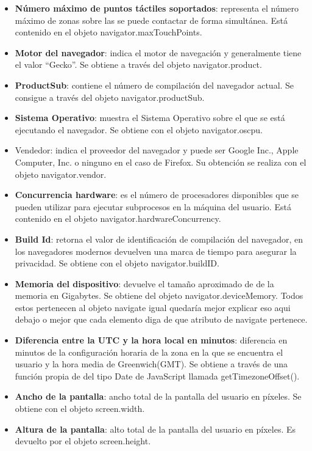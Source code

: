 \begin{itemize}
    \item \textbf{Número máximo de puntos táctiles soportados}: representa el número máximo de zonas sobre las se puede contactar de forma simultánea. Está contenido en el objeto navigator.maxTouchPoints. 
    \item \textbf{Motor del navegador}: indica el motor de navegación y generalmente tiene el valor “Gecko”. Se obtiene a través del objeto navigator.product. 
    \item \textbf{ProductSub}: contiene el número de compilación del navegador actual. Se consigue a través del objeto navigator.productSub. 
    \item \textbf{Sistema Operativo}: muestra el Sistema Operativo sobre el que se está ejecutando el navegador. Se obtiene con el objeto navigator.oscpu.
    \item Vendedor: indica el proveedor del navegador y puede ser Google Inc., Apple Computer, Inc. o ninguno en el caso de Firefox. Su obtención se realiza con el objeto navigator.vendor.
    \item \textbf{Concurrencia hardware}: es el número de procesadores disponibles que se pueden utilizar para ejecutar subprocesos en la máquina del usuario. Está contenido en el objeto navigator.hardwareConcurrency.
    \item \textbf{Build Id}: retorna el valor de identificación de compilación del navegador, en los navegadores modernos devuelven una marca de tiempo para asegurar la privacidad. Se obtiene con el objeto navigator.buildID.
    \item \textbf{Memoria del dispositivo}: devuelve el tamaño aproximado de de la memoria en Gigabytes. Se obtiene del objeto navigator.deviceMemory. 
Todos estos pertenecen al objeto navigate igual quedaría mejor explicar eso aqui debajo o mejor que cada elemento diga de que atributo de navigate pertenece. 
    \item \textbf{Diferencia entre la UTC y la hora local en minutos}: diferencia en minutos de la configuración horaria de la zona en la que se encuentra el usuario y la hora media de Greenwich(GMT). Se obtiene a través de una función propia de del tipo Date de JavaScript llamada getTimezoneOffset().
    \item \textbf{Ancho de la pantalla}: ancho total de la pantalla del usuario en píxeles. Se obtiene con el objeto screen.width.
    \item \textbf{Altura de la pantalla}: alto total de la pantalla del usuario en píxeles. Es devuelto por el objeto screen.height.

\end{itemize}
